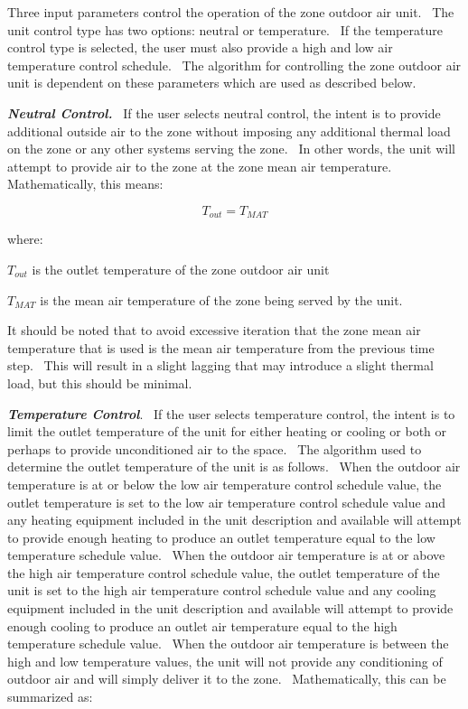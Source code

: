 Three input parameters control the operation of the zone outdoor air unit.~ The unit control type has two options: neutral or temperature.~ If the temperature control type is selected, the user must also provide a high and low air temperature control schedule.~ The algorithm for controlling the zone outdoor air unit is dependent on these parameters which are used as described below.

\textbf{\emph{Neutral Control.}}~ If the user selects neutral control, the intent is to provide additional outside air to the zone without imposing any additional thermal load on the zone or any other systems serving the zone.~ In other words, the unit will attempt to provide air to the zone at the zone mean air temperature.~ Mathematically, this means:

\begin{equation}
{T_{out}} = {T_{MAT}}
\end{equation}

where:

\(T_{out}\) is the outlet temperature of the zone outdoor air unit

\(T_{MAT}\) is the mean air temperature of the zone being served by the unit.

It should be noted that to avoid excessive iteration that the zone mean air temperature that is used is the mean air temperature from the previous time step.~ This will result in a slight lagging that may introduce a slight thermal load, but this should be minimal.

\textbf{\emph{Temperature Control}}.~ If the user selects temperature control, the intent is to limit the outlet temperature of the unit for either heating or cooling or both or perhaps to provide unconditioned air to the space.~ The algorithm used to determine the outlet temperature of the unit is as follows.~ When the outdoor air temperature is at or below the low air temperature control schedule value, the outlet temperature is set to the low air temperature control schedule value and any heating equipment included in the unit description and available will attempt to provide enough heating to produce an outlet temperature equal to the low temperature schedule value.~ When the outdoor air temperature is at or above the high air temperature control schedule value, the outlet temperature of the unit is set to the high air temperature control schedule value and any cooling equipment included in the unit description and available will attempt to provide enough cooling to produce an outlet air temperature equal to the high temperature schedule value.~ When the outdoor air temperature is between the high and low temperature values, the unit will not provide any conditioning of outdoor air and will simply deliver it to the zone.~ Mathematically, this can be summarized as:

